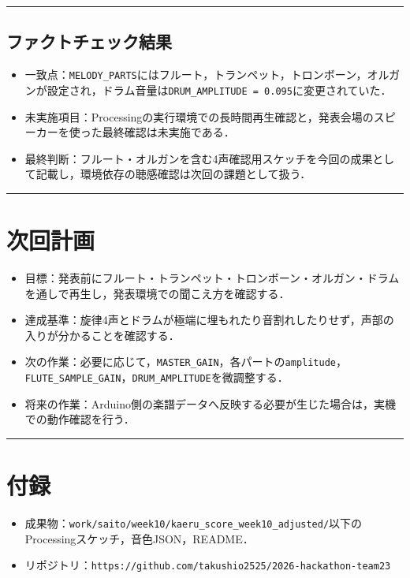 \documentclass[uplatex,dvipdfmx,a4paper,11pt]{jsarticle}
\newcommand{\sectionrule}{\par\medskip\noindent\rule{\linewidth}{0.6pt}\par\medskip}
\begin{document}
\sectionrule

\subsection{ファクトチェック結果}

\begin{itemize}
  \item 一致点：\texttt{MELODY\_PARTS}にはフルート，トランペット，トロンボーン，オルガンが設定され，ドラム音量は\texttt{DRUM\_AMPLITUDE = 0.095}に変更されていた．
  \item 未実施項目：Processingの実行環境での長時間再生確認と，発表会場のスピーカーを使った最終確認は未実施である．
  \item 最終判断：フルート・オルガンを含む4声確認用スケッチを今回の成果として記載し，環境依存の聴感確認は次回の課題として扱う．
\end{itemize}

\sectionrule

\section{次回計画}

\begin{itemize}
  \item 目標：発表前にフルート・トランペット・トロンボーン・オルガン・ドラムを通しで再生し，発表環境での聞こえ方を確認する．
  \item 達成基準：旋律4声とドラムが極端に埋もれたり音割れしたりせず，声部の入りが分かることを確認する．
  \item 次の作業：必要に応じて，\texttt{MASTER\_GAIN}，各パートの\texttt{amplitude}，\texttt{FLUTE\_SAMPLE\_GAIN}，\texttt{DRUM\_AMPLITUDE}を微調整する．
  \item 将来の作業：Arduino側の楽譜データへ反映する必要が生じた場合は，実機での動作確認を行う．
\end{itemize}

\sectionrule

\section{付録}

\begin{itemize}
  \item 成果物：\texttt{work/saito/week10/kaeru\_score\_week10\_adjusted/}以下のProcessingスケッチ，音色JSON，README．
  \item リポジトリ：\texttt{https://github.com/takushio2525/2026-hackathon-team23}
\end{itemize}
\end{document}

